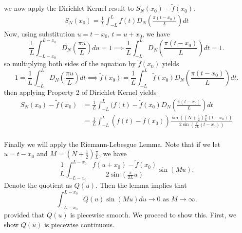 \documentclass[class=article,crop=false]{standalone}
\begin{document}
\begin{prf}
we now apply the Dirichlet Kernel result to $S_N(x_0) - \tilde{f}(x_0) $. 
\begin{align*}
	S_N(x_0) = \frac{1}{L} \int_{-L}^{L} f(t) D_N\left(\frac{\pi (t-x_0)}{L}\right) dt 
\end{align*}
Now, using substitution $u = t-x_0$, $t=u+x_0$, we have
\[
	\frac{1}{L} \int_{-L-x_0}^{L-x_0} D_N\left( \frac{\pi u}{L} \right) du = 1 \implies \frac{1}{L} \int_{-L}^{L} D_N\left( \frac{\pi (t-x_0)}{L} \right) dt = 1  
.\] 
so multiplying both sides of the equation by $\tilde{ f } (x_0)$ yields
\[
	1=\frac{1}{L}\int_{-L}^{L} D_N\left( \frac{\pi u}{L} \right) dt \implies \tilde{ f } (x_0) = \frac{1}{L} \int_{-L}^{L} \tilde{ f } (x_0) D_N\left( \frac{\pi (t-x_0)}{L} \right) dt  
.\] 
then applying Property 2 of Dirichlet Kernel yields 
\begin{align*}
	S_N(x_0)-\tilde{ f } (x_0) &= \frac{1}{L} \int_{-L}^{L} (f(t) - \tilde{ f } (x_0) D_N\left( \frac{\pi(t-x_0)}{L} \right) dt  \\
				   &= \frac{1}{L} \int_{-L}^{L} (f(t) -\tilde{ f } (x_0)) \frac{\sin\left( (N+\frac{1}{2}) \frac{\pi}{L} (t-x_0) \right) }{2\sin(\frac{\pi}{2L}(t-x_0) )} \\
\end{align*}

Finally we will apply the Riemann-Lebesgue Lemma. Note that if we let $ u=t-x_0$ and $M=(N+\frac{1}{2})\frac{\pi}{L}$, we have
\[
	\frac{1}{L}\int_{-L-x_0}^{L-x_0} \frac{f(u+x_0)-\tilde{ f } (x_0)}{2\sin\left( \frac{\pi}{2L}u \right) } \sin\left( Mu \right)   
.\] 
Denote the quotient as $Q(u)$. Then the lemma implies that
 \[
	 \int_{-L-x_0}^{L-x_0} Q(u) \sin(Mu) du \to 0 \text{ as } M \to \infty   
.\] 
provided that $Q(u)$ is piecewise smooth. We proceed to show this. First, we show  $Q(u)$ is piecewise continuous. 


\end{prf}
\end{document}
